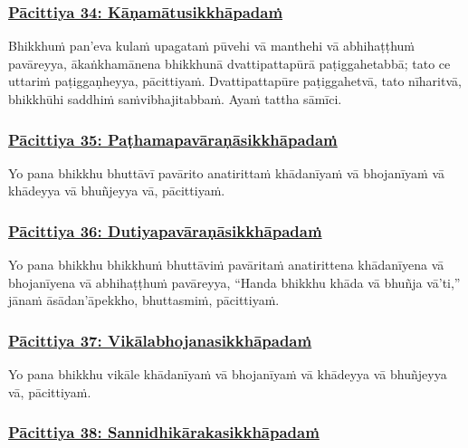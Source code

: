 \subsubsection*{\hyperref[exp34]{Pācittiya 34: Kāṇamātusikkhāpadaṁ}}
\label{pac34}

Bhikkhuṁ pan'eva kulaṁ upagataṁ pūvehi vā manthehi vā abhihaṭṭhuṁ pavāreyya, ākaṅkhamānena bhikkhunā dvattipattapūrā paṭiggahetabbā; tato ce uttariṁ paṭiggaṇheyya, pācittiyaṁ. Dvattipattapūre paṭiggahetvā, tato nīharitvā, bhikkhūhi saddhiṁ saṁvibhajitabbaṁ. Ayaṁ tattha sāmīci.



\subsubsection*{\hyperref[exp35]{Pācittiya 35: Paṭhamapavāraṇāsikkhāpadaṁ}}
\label{pac35}

Yo pana bhikkhu bhuttāvī pavārito anatirittaṁ khādanīyaṁ vā bhojanīyaṁ vā khādeyya vā bhuñjeyya vā, pācittiyaṁ.



\subsubsection*{\hyperref[exp36]{Pācittiya 36: Dutiyapavāraṇāsikkhāpadaṁ}}
\label{pac36}

Yo pana bhikkhu bhikkhuṁ bhuttāviṁ pavāritaṁ anatirittena khādanīyena vā bhojanīyena vā abhihaṭṭhuṁ pavāreyya, ``Handa bhikkhu khāda vā bhuñja vā'ti,'' jānaṁ āsādan'āpekkho, bhuttasmiṁ, pācittiyaṁ.



\subsubsection*{\hyperref[exp37]{Pācittiya 37: Vikālabhojanasikkhāpadaṁ}}
\label{pac37}

Yo pana bhikkhu vikāle khādanīyaṁ vā bhojanīyaṁ vā khādeyya vā bhuñjeyya vā, pācittiyaṁ.



\subsubsection*{\hyperref[exp38]{Pācittiya 38: Sannidhikārakasikkhāpadaṁ}}
\label{pac38}

